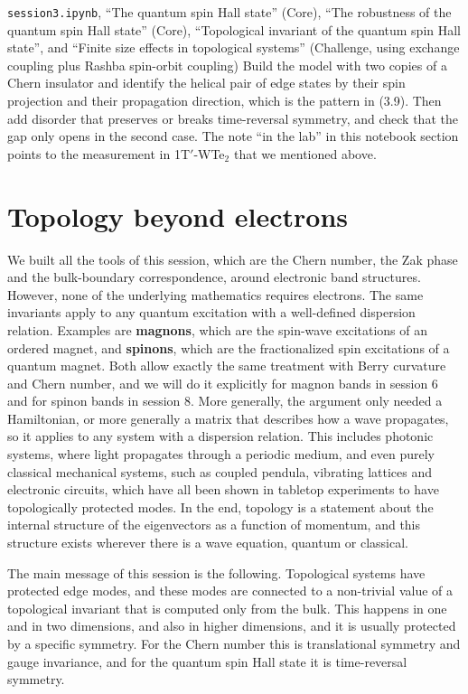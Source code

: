 \begin{notebookbox}{\texttt{session3.ipynb}, ``The quantum spin Hall state'' (Core), ``The robustness of the quantum spin Hall state'' (Core), ``Topological invariant of the quantum spin Hall state'', and ``Finite size effects in topological systems'' (Challenge, using exchange coupling plus Rashba spin-orbit coupling)}
Build the model with two copies of a Chern insulator and identify the helical pair of edge states by
their spin projection and their propagation direction, which is the pattern in (3.9). Then add
disorder that preserves or breaks time-reversal symmetry, and check that the gap only opens in the
second case. The note ``in the lab'' in this notebook section points to the measurement in
1T$'$-WTe$_2$ that we mentioned above.
\end{notebookbox}

\section{Topology beyond electrons}

We built all the tools of this session, which are the Chern number, the Zak phase and the
bulk-boundary correspondence, around electronic band structures. However, none of the underlying
mathematics requires electrons. The same invariants apply to any quantum excitation with a
well-defined dispersion relation. Examples are \textbf{magnons}, which are the spin-wave excitations
of an ordered magnet, and \textbf{spinons}, which are the fractionalized spin excitations of a quantum
magnet. Both allow exactly the same treatment with Berry curvature and Chern number, and we will do it
explicitly for magnon bands in session 6 and for spinon bands in session 8. More generally, the
argument only needed a Hamiltonian, or more generally a matrix that describes how a wave propagates,
so it applies to any system with a dispersion relation. This includes photonic systems, where light
propagates through a periodic medium, and even purely classical mechanical systems, such as coupled
pendula, vibrating lattices and electronic circuits, which have all been shown in tabletop experiments
to have topologically protected modes. In the end, topology is a statement about the internal
structure of the eigenvectors as a function of momentum, and this structure exists wherever there is a
wave equation, quantum or classical.

The main message of this session is the following. Topological systems have protected edge modes, and
these modes are connected to a non-trivial value of a topological invariant that is computed only from
the bulk. This happens in one and in two dimensions, and also in higher dimensions, and it is usually
protected by a specific symmetry. For the Chern number this is translational symmetry and gauge
invariance, and for the quantum spin Hall state it is time-reversal symmetry.

